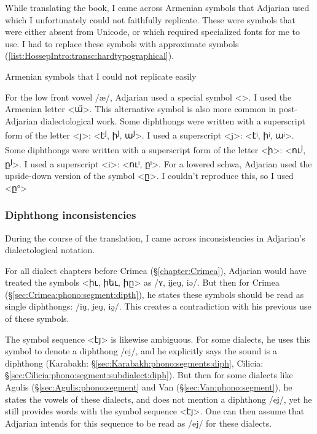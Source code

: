 While translating the book, I came across Armenian symbols that Adjarian used which I unfortunately could not faithfully replicate. These were symbols that were either absent from Unicode, or which required specialized fonts for me to use. I had to replace these symbols with approximate symbols (\ref{list:HossepIntro:transc:hardtypographical}).

\begin{exe}
	\ex Armenian symbols that I could not replicate easily\label{list:HossepIntro:transc:hardtypographical}
	\begin{xlist}
\ex For the low front vowel /æ/, Adjarian used a special symbol 
<>. I used the  Armenian letter <ա̈>. This alternative symbol is also more common in post-Adjarian dialectological work. 
\ex Some diphthongs were written with a superscript form of the letter <յ>: <է\textsuperscript{յ}, ի\textsuperscript{յ},   ա\textsuperscript{յ}>. I used a superscript <j>: 	<էʲ, իʲ, աʲ>. 
\ex Some diphthongs were written with a superscript form of the letter <ի>: <ու\textsuperscript{յ}, ը\textsuperscript{յ}>. I used a superscript <i>: 	<ուⁱ, ըⁱ>. 
\ex For a lowered schwa, Adjarian used the  upside-down version of the symbol <ը>. I couldn't reproduce this, so I used  <ը°> 
	\end{xlist}
\end{exe}



\subsubsection{Diphthong inconsistencies}\label{sec:HossepIntro:phonotransc:adjerror}

During the course of the translation, I came across inconsistencies in Adjarian's dialectological notation. 

For all dialect chapters before Crimea (\S\ref{chapter:Crimea}), Adjarian would have treated the symbols <իւ, իեւ, իը> as  /ʏ, ii̯eu̯, iə/. But then for Crimea (\S\ref{sec:Crimea:phono:segment:dipth}), he states these symbols should be read as single diphthongs: /iu̯, i̯eu̯,  iə̯/. This creates a contradiction with his previous use of these symbols.


The symbol sequence <էյ> is likewise ambiguous. For some dialects, he uses this symbol to denote a diphthong /ei̯/, and he explicitly says the sound is a diphthong (Karabakh: \S\ref{sec:Karabakh:phono:segments:diph}, Cilicia: \S\ref{sec:Cilicia:phono:segment:subdialect:diph}). But then for some dialects like Agulis (\S\ref{sec:Agulis:phono:segment} and Van (\S\ref{sec:Van:phono:segment}), he states the vowels of these dialects, and does not mention a diphthong /ei̯/, yet he still provides words with the symbol sequence <էյ>. One can then assume that Adjarian intends for this sequence to be read as /ej/ for these dialects.  

